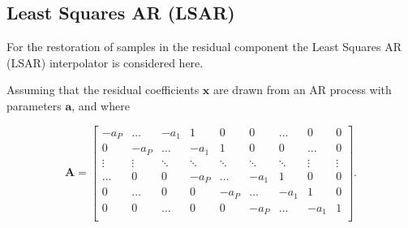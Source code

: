 %
%
%


\subsection{Least Squares AR (LSAR)}
For the restoration of samples in the residual component the Least Squares AR (LSAR) interpolator is considered here\cite{Godsill1998book}.

Assuming that the residual coefficients $\mathbf{x}$ are drawn from an AR process with parameters $\mathbf{a}$, and where

\begin{equation}\label{eq:LSAR0} \mathbf{A} =
\begin{bmatrix}
    -a_P    & \ldots & -a_1 & 1 & 0 & 0 & \ldots & 0 & 0 \\
    0       & -a_P & \ldots & -a_1 & 1 & 0 & 0 & \ldots & 0 \\
    \vdots  & \vdots    & \ddots & \ddots & \ddots & \ddots & \ddots & \vdots & \vdots \\
    \ldots  & 0 & 0 & -a_P    & \ldots & -a_1 & 1 & 0 & 0 \\
    0       & \ldots  & 0 & 0 & -a_P    & \ldots & -a_1 & 1 & 0 \\
    0       & 0 & \ldots  & 0 & 0 & -a_P    & \ldots & -a_1 & 1 \\
\end{bmatrix}.
\end{equation}

